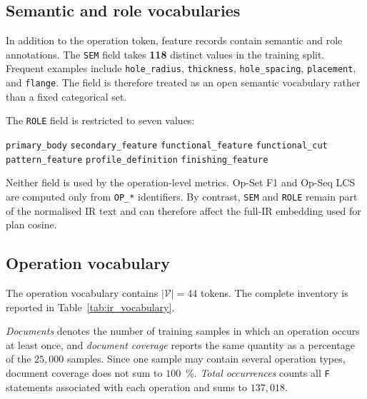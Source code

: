 \documentclass[preprint,12pt]{elsarticle}
\begin{document}
\subsection{Semantic and role vocabularies}
\label{app:ir_metrics}

In addition to the operation token, feature records contain semantic and role annotations.
The \texttt{SEM} field takes \textbf{118} distinct values in the training split. Frequent
examples include \texttt{hole\_radius}, \texttt{thickness}, \texttt{hole\_spacing},
\texttt{placement}, and \texttt{flange}. The field is therefore treated as an open
semantic vocabulary rather than a fixed categorical set.

The \texttt{ROLE} field is restricted to seven values:

\begin{center}
  \footnotesize
  \texttt{primary\_body} \quad \texttt{secondary\_feature} \quad
  \texttt{functional\_feature} \quad \texttt{functional\_cut} \\
  \texttt{pattern\_feature} \quad \texttt{profile\_definition} \quad
  \texttt{finishing\_feature}
\end{center}

Neither field is used by the operation-level metrics. Op-Set F1 and Op-Seq LCS are
computed only from \texttt{OP\_*} identifiers. By contrast, \texttt{SEM} and
\texttt{ROLE} remain part of the normalised IR text and can therefore affect the full-IR
embedding used for plan cosine.

\subsection{Operation vocabulary}
\label{app:ir_vocabulary}

The operation vocabulary contains $|\mathcal{V}|=44$ tokens. The complete inventory is
reported in Table~\ref{tab:ir_vocabulary}.

\emph{Documents} denotes the number of training samples in which an operation occurs at
least once, and \emph{document coverage} reports the same quantity as a percentage of the
$25{,}000$ samples. Since one sample may contain several operation types, document
coverage does not sum to $100$~\%. \emph{Total occurrences} counts all \texttt{F}
statements associated with each operation and sums to $137{,}018$.
\end{document}

